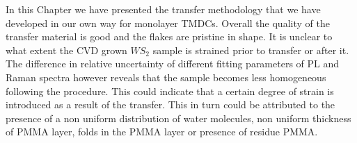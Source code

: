 In this Chapter we have presented the transfer methodology that we have developed in our own way for monolayer TMDCs. Overall the quality of the transfer material is good and the flakes are pristine in shape. It is unclear to what extent the CVD grown $WS_2$ sample is strained prior to transfer or after it. The difference in relative uncertainty of different fitting parameters of PL and Raman spectra however reveals that the sample becomes less homogeneous following the procedure. This could indicate that a certain degree of strain is introduced as a result of the transfer. This in turn could be attributed to the presence of a non uniform distribution of water molecules, non uniform thickness of PMMA layer, folds in the PMMA layer or presence of residue PMMA.